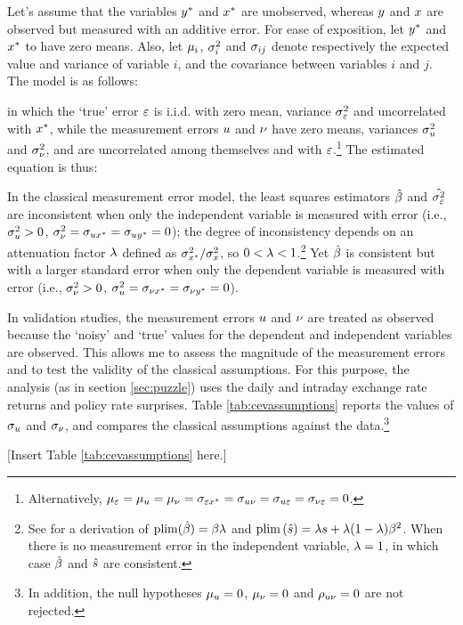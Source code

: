 \documentclass[a4paper,12pt]{article} 		%
\begin{document}
\begin{appendices}
Let's assume that the variables \(y^{*}\) and \(x^{*}\) are unobserved, whereas \(y\) and \(x\) are observed but measured with an additive error. For ease of exposition, let \(y^{*}\) and \(x^{*}\) to have zero means. Also, let \(\mu_{i}\), \(\sigma^{2}_{i}\) and \(\sigma_{ij}\) denote respectively the expected value and variance of variable \(i\), and the covariance between variables \(i\) and \(j\). 
The model is as follows: 

\noindent in which the `true' error \(\varepsilon\) is i.i.d. with zero mean, variance \(\sigma^{2}_{\varepsilon}\) and uncorrelated with \(x^{*}\), while the measurement errors \(u\) and \(\nu\) have zero means, variances \(\sigma^{2}_{u}\) and \(\sigma^{2}_{\nu}\), and are uncorrelated among themselves and with \(\varepsilon\).\footnote{Alternatively, \(\mu_{\varepsilon} = \mu_{u} = \mu_{\nu} = \sigma_{\varepsilon x^{*}} = \sigma_{u \nu} = \sigma_{u \varepsilon} = \sigma_{\nu \varepsilon} = 0\).} The estimated equation is thus:


In the classical measurement error model, the least squares estimators \(\hat{\beta}\) and \(\hat{\sigma^{2}_{\varepsilon}}\) are inconsistent when only the independent variable is measured with error (i.e., \(\sigma^{2}_{u} > 0\), \(\sigma^{2}_{\nu} = \sigma_{u x^{*}} = \sigma_{u y^{*}} = 0\)); the degree of inconsistency depends on an attenuation factor \(\lambda\) defined as \(\sigma^{2}_{x^{*}} /\sigma^{2}_{x}\), so \(0< \lambda < 1\).\footnote{ See \textcite{Pischke:2007} for a derivation of \(\mathrm{plim} (\hat{\beta}) = \beta \lambda\) and \(\mathrm{plim} \left( \hat{s} \right) = \lambda s + \lambda(1 - \lambda) \beta^{2}\). When there is no measurement error in the independent variable, \(\lambda = 1\), in which case \(\hat{\beta}\) and \(\hat{s}\) are consistent.} Yet \(\hat{\beta}\) is consistent but with a larger standard error when only the dependent variable is measured with error (i.e., \(\sigma^{2}_{\nu} > 0\), \(\sigma^{2}_{u} = \sigma_{\nu x^{*}} = \sigma_{\nu y^{*}} = 0\)). 

In validation studies, the measurement errors \(u\) and \(\nu\) are treated as observed because the `noisy' and `true' values for the dependent and independent variables are observed. This allows me to assess the magnitude of the measurement errors and to test the validity of the classical assumptions. For this purpose, the analysis (as in section \ref{sec:puzzle}) uses the daily and intraday exchange rate returns and policy rate surprises. Table \ref{tab:cevassumptions} reports the values of \(\sigma_{u}\) and \(\sigma_{\nu}\), and compares the classical assumptions against the data.\footnote{In addition, the null hypotheses \(\mu_{u} = 0\), \(\mu_{\nu} = 0\) and \(\rho_{u \nu} = 0\) are not rejected.} 

\begin{center}
	[Insert Table \ref{tab:cevassumptions} here.]
\end{center}


\end{appendices}
\end{document}
